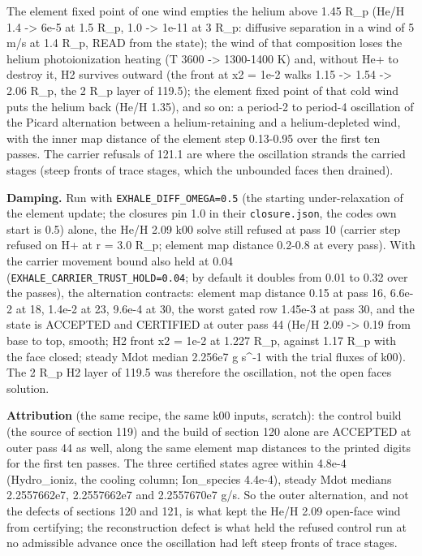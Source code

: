 \documentclass[english,a4paper]{my_memo}
\begin{document}
The element fixed point of one wind empties the helium above 1.45 R\_p
(He/H 1.4 -\textgreater{} 6e-5 at 1.5 R\_p, 1.0 -\textgreater{} 1e-11 at 3 R\_p: diffusive separation in a
wind of 5 m/s at 1.4 R\_p, READ from the state); the wind of that composition
loses the helium photoionization heating (T 3600 -\textgreater{} 1300-1400 K) and,
without He+ to destroy it, H2 survives outward (the front at x2 = 1e-2 walks
1.15 -\textgreater{} 1.54 -\textgreater{} 2.06 R\_p, the 2 R\_p layer of 119.5); the element fixed point
of that cold wind puts the helium back (He/H 1.35), and so on: a period-2
to period-4 oscillation of the Picard alternation between a
helium-retaining and a helium-depleted wind, with the inner map distance of
the element step 0.13-0.95 over the first ten passes. The carrier refusals of 121.1 are
where the oscillation strands the carried stages (steep fronts of trace
stages, which the unbounded faces then drained).

\textbf{Damping.} Run with \texttt{EXHALE\_DIFF\_OMEGA=0.5} (the starting under-relaxation
of the element update; the closures pin 1.0 in their \texttt{closure.json}, the
code\textquotesingle s own start is 0.5) alone, the He/H 2.09 k00 solve still
refused at pass 10 (carrier step refused on H+ at r = 3.0 R\_p; element map
distance 0.2-0.8 at every pass). With the carrier movement bound also held
at 0.04 (\texttt{EXHALE\_CARRIER\_TRUST\_HOLD=0.04}; by default it doubles from 0.01
to 0.32 over the passes), the alternation contracts: element map distance
0.15 at pass 16, 6.6e-2 at 18, 1.4e-2 at 23, 9.6e-4 at 30, the worst gated
row 1.45e-3 at pass 30, and the state is ACCEPTED and CERTIFIED at outer
pass 44 (He/H 2.09 -\textgreater{} 0.19 from base to top, smooth; H2 front x2 = 1e-2 at
1.227 R\_p, against 1.17 R\_p with the face closed; steady Mdot median
2.256e7 g s\^{}-1 with the trial fluxes of k00). The 2 R\_p H2 layer of 119.5
was therefore the oscillation, not the open face\textquotesingle s solution.

\textbf{Attribution} (the same recipe, the same k00 inputs, scratch): the control
build (the source of section 119) and the build of section 120 alone are
ACCEPTED at outer pass 44 as well, along the same element map distances to
the printed digits for the first ten passes. The three certified states agree
within 4.8e-4 (Hydro\_ioniz, the cooling column; Ion\_species 4.4e-4), steady
Mdot medians 2.2557662e7, 2.2557662e7 and 2.2557670e7 g/s. So the outer
alternation, and not the defects of sections 120 and 121, is what kept the
He/H 2.09 open-face wind from certifying; the reconstruction defect is what
held the refused control run at no admissible advance once the oscillation
had left steep fronts of trace stages.
\end{document}
